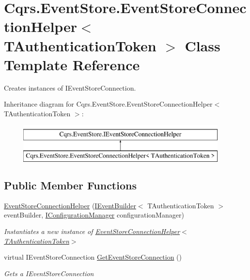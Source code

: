 \hypertarget{classCqrs_1_1EventStore_1_1EventStoreConnectionHelper}{}\section{Cqrs.\+Event\+Store.\+Event\+Store\+Connection\+Helper$<$ T\+Authentication\+Token $>$ Class Template Reference}
\label{classCqrs_1_1EventStore_1_1EventStoreConnectionHelper}


Creates instances of I\+Event\+Store\+Connection.  


Inheritance diagram for Cqrs.\+Event\+Store.\+Event\+Store\+Connection\+Helper$<$ T\+Authentication\+Token $>$\+:\begin{figure}[H]
\begin{center}
\leavevmode
\includegraphics[height=2.000000cm]{classCqrs_1_1EventStore_1_1EventStoreConnectionHelper}
\end{center}
\end{figure}
\subsection*{Public Member Functions}
\begin{DoxyCompactItemize}
\item 
\hyperlink{classCqrs_1_1EventStore_1_1EventStoreConnectionHelper_ac9d232e255275c70aee4465b08e7fd79_ac9d232e255275c70aee4465b08e7fd79}{Event\+Store\+Connection\+Helper} (\hyperlink{interfaceCqrs_1_1EventStore_1_1IEventBuilder}{I\+Event\+Builder}$<$ T\+Authentication\+Token $>$ event\+Builder, \hyperlink{interfaceCqrs_1_1Configuration_1_1IConfigurationManager}{I\+Configuration\+Manager} configuration\+Manager)
\begin{DoxyCompactList}\small\item\em Instantiates a new instance of \hyperlink{classCqrs_1_1EventStore_1_1EventStoreConnectionHelper_ac9d232e255275c70aee4465b08e7fd79_ac9d232e255275c70aee4465b08e7fd79}{Event\+Store\+Connection\+Helper$<$\+T\+Authentication\+Token$>$} \end{DoxyCompactList}\item 
virtual I\+Event\+Store\+Connection \hyperlink{classCqrs_1_1EventStore_1_1EventStoreConnectionHelper_a36c7ef0505319af9f8ae02da0050ab30_a36c7ef0505319af9f8ae02da0050ab30}{Get\+Event\+Store\+Connection} ()
\begin{DoxyCompactList}\small\item\em Gets a I\+Event\+Store\+Connection \end{DoxyCompactList}\end{DoxyCompactItemize}
